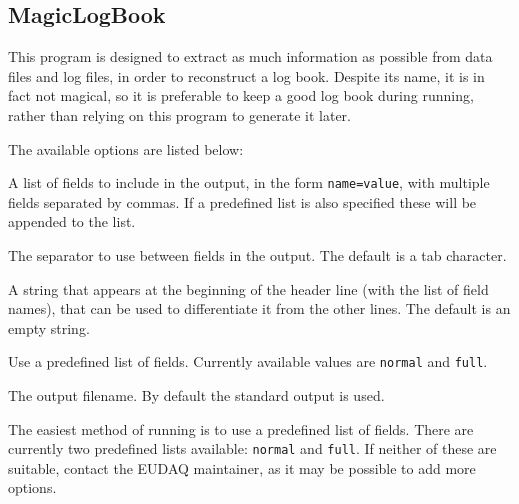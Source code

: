 \subsection{MagicLogBook}
\label{sec:MagicLogBook}
This program is designed to extract as much information as possible from data files and log files,
in order to reconstruct a log book.
Despite its name, it is in fact not magical,
so it is preferable to keep a good log book during running,
rather than relying on this program to generate it later.

The available options are listed below:
\begin{description}
A list of fields to include in the output, in the form \texttt{name=value},
with multiple fields separated by commas.
If a predefined list is also specified these will be appended to the list.

The separator to use between fields in the output. The default is a tab character.

A string that appears at the beginning of the header line (with the list of field names),
that can be used to differentiate it from the other lines. The default is an empty string.

Use a predefined list of fields.
Currently available values are \texttt{normal} and \texttt{full}.

The output filename. By default the standard output is used.

\end{description}

The easiest method of running is to use a predefined list of fields.
There are currently two predefined lists available: \texttt{normal} and \texttt{full}.
If neither of these are suitable, contact the EUDAQ maintainer,
as it may be possible to add more options.

